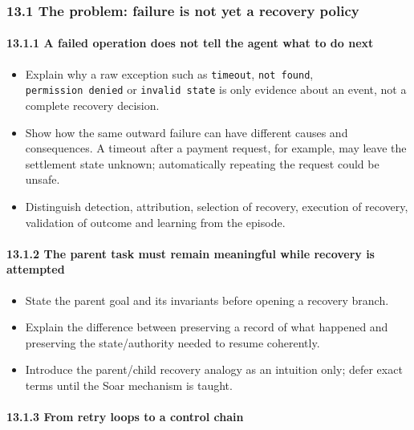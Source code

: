 \subsubsection{13.1 The problem: failure is not yet a recovery policy}\label{131-the-problem-failure-is-not-yet-a-recovery-policy}

\paragraph{13.1.1 A failed operation does not tell the agent what to do next}\label{1311-a-failed-operation-does-not-tell-the-agent-what-to-do-next}

\begin{itemize}
\tightlist
\item
  Explain why a raw exception such as \texttt{timeout}, \texttt{not\ found}, \texttt{permission\ denied} or \texttt{invalid\ state} is only evidence about an event, not a complete recovery decision.
\item
  Show how the same outward failure can have different causes and consequences. A timeout after a payment request, for example, may leave the settlement state unknown; automatically repeating the request could be unsafe.
\item
  Distinguish detection, attribution, selection of recovery, execution of recovery, validation of outcome and learning from the episode.
\end{itemize}

\paragraph{13.1.2 The parent task must remain meaningful while recovery is attempted}\label{1312-the-parent-task-must-remain-meaningful-while-recovery-is-attempted}

\begin{itemize}
\tightlist
\item
  State the parent goal and its invariants before opening a recovery branch.
\item
  Explain the difference between preserving a record of what happened and preserving the state/authority needed to resume coherently.
\item
  Introduce the parent/child recovery analogy as an intuition only; defer exact terms until the Soar mechanism is taught.
\end{itemize}

\paragraph{13.1.3 From retry loops to a control chain}\label{1313-from-retry-loops-to-a-control-chain}

